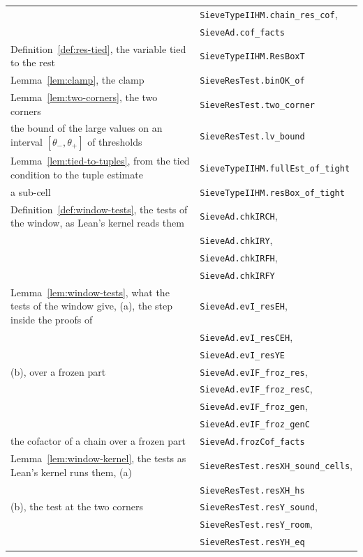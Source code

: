 \documentclass[11pt]{article}
\theoremstyle{definition}
\newcommand{\lean}[1]{\texttt{#1}}
\begin{document}
{\begin{longtable}{@{}>{\raggedright\arraybackslash}p{}l@{}}
 & \lean{SieveTypeIIHM.chain\_res\_cof}, \\
 & \lean{SieveAd.cof\_facts} \\
Definition~\ref{def:res-tied}, the variable tied to the rest & \lean{SieveTypeIIHM.ResBoxT} \\
Lemma~\ref{lem:clamp}, the clamp & \lean{SieveResTest.binOK\_of} \\
Lemma~\ref{lem:two-corners}, the two corners & \lean{SieveResTest.two\_corner} \\
\quad the bound of the large values on an interval $[\theta_-, \theta_+]$ of thresholds & \lean{SieveResTest.lv\_bound} \\
Lemma~\ref{lem:tied-to-tuples}, from the tied condition to the tuple estimate & \lean{SieveTypeIIHM.fullEst\_of\_tight}
\\
\quad a sub-cell & \lean{SieveTypeIIHM.resBox\_of\_tight} \\
Definition~\ref{def:window-tests}, the tests of the window, as Lean's kernel reads them & \lean{SieveAd.chkIRCH}, \\
 & \lean{SieveAd.chkIRY}, \\
 & \lean{SieveAd.chkIRFH}, \\
 & \lean{SieveAd.chkIRFY} \\
Lemma~\ref{lem:window-tests}, what the tests of the window give, (a), the step inside the proofs of &
\lean{SieveAd.evI\_resEH}, \\
 & \lean{SieveAd.evI\_resCEH}, \\
 & \lean{SieveAd.evI\_resYE} \\
\quad (b), over a frozen part & \lean{SieveAd.evIF\_froz\_res}, \\
 & \lean{SieveAd.evIF\_froz\_resC}, \\
 & \lean{SieveAd.evIF\_froz\_gen}, \\
 & \lean{SieveAd.evIF\_froz\_genC} \\
\quad the cofactor of a chain over a frozen part & \lean{SieveAd.frozCof\_facts} \\
Lemma~\ref{lem:window-kernel}, the tests as Lean's kernel runs them, (a) & \lean{SieveResTest.resXH\_sound\_cells}, \\
 & \lean{SieveResTest.resXH\_hs} \\
\quad (b), the test at the two corners & \lean{SieveResTest.resY\_sound}, \\
 & \lean{SieveResTest.resY\_room}, \\
 & \lean{SieveResTest.resYH\_eq} \\

\end{longtable}}
\end{document}
